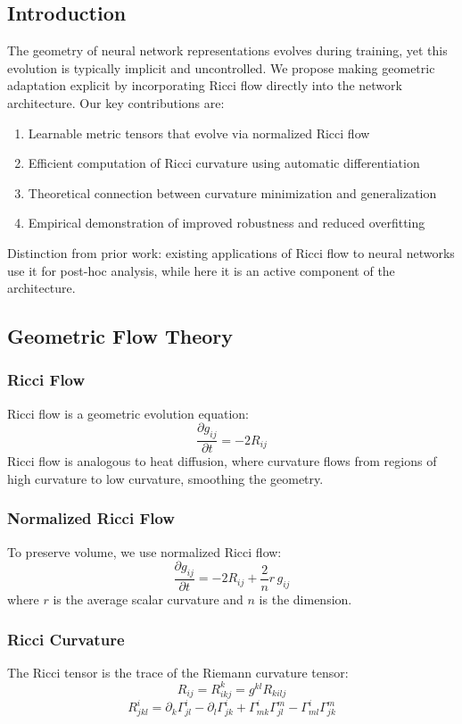 \documentclass{article}
\numberwithin{equation}{section}
\begin{document}
\subsection{Introduction}
The geometry of neural network representations evolves during training, yet this evolution is typically implicit and uncontrolled. We propose making geometric adaptation explicit by incorporating Ricci flow directly into the network architecture.
Our key contributions are:
\begin{enumerate}
\item Learnable metric tensors that evolve via normalized Ricci flow
\item Efficient computation of Ricci curvature using automatic differentiation
\item Theoretical connection between curvature minimization and generalization
\item Empirical demonstration of improved robustness and reduced overfitting
\end{enumerate}
Distinction from prior work: existing applications of Ricci flow to neural networks use it for post-hoc analysis, while here it is an active component of the architecture.

\subsection{Geometric Flow Theory}
\subsubsection{Ricci Flow}
Ricci flow is a geometric evolution equation:
\[
\frac{\partial g_{ij}}{\partial t} = -2R_{ij}
\]
Ricci flow is analogous to heat diffusion, where curvature flows from regions of high curvature to low curvature, smoothing the geometry.

\subsubsection{Normalized Ricci Flow}
To preserve volume, we use normalized Ricci flow:
\[
\frac{\partial g_{ij}}{\partial t} = -2R_{ij} + \frac{2}{n} r\, g_{ij}
\]
where $r$ is the average scalar curvature and $n$ is the dimension.

\subsubsection{Ricci Curvature}
The Ricci tensor is the trace of the Riemann curvature tensor:
\[
R_{ij} = R^k_{ikj} = g^{kl} R_{kilj}
\]
\[
R^i_{jkl} = \partial_k \Gamma^i_{jl} - \partial_l \Gamma^i_{jk} + \Gamma^i_{mk}\Gamma^m_{jl} - \Gamma^i_{ml}\Gamma^m_{jk}
\]
\end{document}

